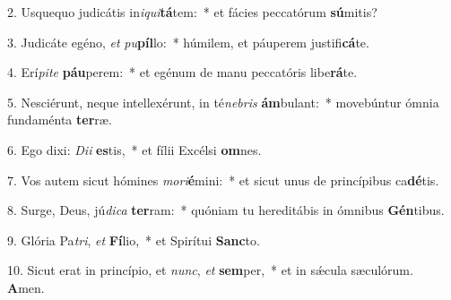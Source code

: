 2. Usquequo judicátis in\textit{i}\textit{qui}\textbf{tá}tem:~*  et fácies peccatórum \textbf{sú}mitis?\

3. Judicáte egéno, \textit{et} \textit{pu}\textbf{píl}lo:~*  húmilem, et páuperem justifi\textbf{cá}te.\

4. Erí\textit{pi}\textit{te} \textbf{páu}perem:~*  et egénum de manu peccatóris libe\textbf{rá}te.\

5. Nesciérunt, neque intellexérunt, in té\textit{ne}\textit{bris} \textbf{ám}bulant:~*  movebúntur ómnia fundaménta \textbf{ter}ræ.\

6. Ego dixi: \textit{Di}\textit{i} \textbf{es}tis,~*  et fílii Excélsi \textbf{om}nes.\

7. Vos autem sicut hómines \textit{mo}\textit{ri}\textbf{é}mini:~*  et sicut unus de princípibus ca\textbf{dé}tis.\

8. Surge, Deus, jú\textit{di}\textit{ca} \textbf{ter}ram:~*  quóniam tu hereditábis in ómnibus \textbf{Gén}tibus.\

9. Glória Pa\textit{tri}, \textit{et} \textbf{Fí}lio,~*  et Spirítui \textbf{Sanc}to.\

10. Sicut erat in princípio, et \textit{nunc}, \textit{et} \textbf{sem}per,~*  et in sǽcula sæculórum. \textbf{A}men.\

